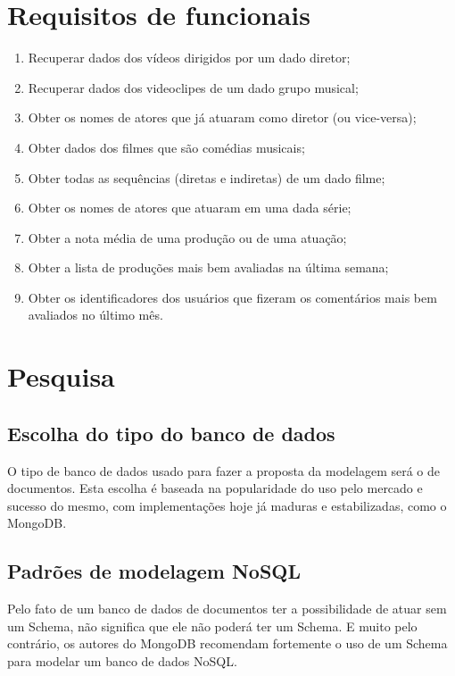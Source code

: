 \documentclass[
	12pt,				%
	openright,			%
	oneside,			%
	a4paper,			%
	english,			%
	french,				%
	spanish,			%
	brazil,				%
	]{abntex2}
\begin{document}
\chapter{Requisitos de funcionais}
\begin{enumerate}
  \item Recuperar dados dos vídeos dirigidos por um dado diretor;
	\item Recuperar dados dos videoclipes de um dado grupo musical;
	\item Obter os nomes de atores que já atuaram como diretor (ou vice-versa);
	\item Obter dados dos filmes que são comédias musicais;
	\item Obter todas as sequências (diretas e indiretas) de um dado filme;
	\item Obter os nomes de atores que atuaram em uma dada série;
	\item Obter a nota média de uma produção ou de uma atuação;
	\item Obter a lista de produções mais bem avaliadas na última semana;
	\item Obter os identificadores dos usuários que fizeram os comentários mais bem avaliados no último mês.
\end{enumerate}

\chapter{Pesquisa}

\section{Escolha do tipo do banco de dados}

O tipo de banco de dados usado para fazer a proposta da modelagem será o de documentos. Esta escolha é baseada na popularidade do uso pelo mercado e sucesso do mesmo, com implementações hoje já maduras e estabilizadas, como o MongoDB.

\section{Padrões de modelagem NoSQL}
Pelo fato de um banco de dados de documentos ter a possibilidade de atuar sem um Schema, não significa que ele não poderá ter um Schema. E muito pelo contrário, os autores do MongoDB recomendam fortemente o uso de um Schema para modelar um banco de dados NoSQL.
\end{document}
